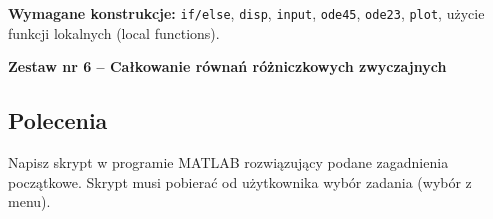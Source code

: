 \documentclass[a4paper,11pt]{article}
\begin{document}
\vspace{0.3cm}
\begin{ramka}
\textbf{Wymagane konstrukcje:}
\texttt{if/else}, \texttt{disp}, \texttt{input}, \texttt{ode45}, \texttt{ode23}, \texttt{plot}, użycie funkcji lokalnych (local functions).
\end{ramka}

\clearpage
\begin{center}
  {\large\bfseries Zestaw nr 6 \quad -- \quad Całkowanie równań różniczkowych zwyczajnych}
\end{center}
\hrulefill
\vspace{0.4cm}

\subsection*{Polecenia}

Napisz skrypt w programie MATLAB rozwiązujący podane zagadnienia początkowe. Skrypt musi pobierać od użytkownika wybór zadania (wybór z menu).
\end{document}
